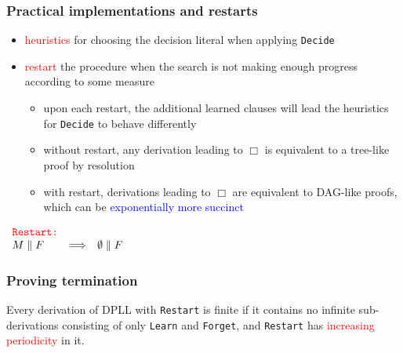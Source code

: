 \documentclass[smaller]{beamer}
\newcommand{\state}[2]{{#1\parallel #2}}
\newcommand{\blue}[1]{\textcolor{blue}{#1}}
\newcommand{\red}[1]{\textcolor{red}{#1}}
\begin{document}
\begin{frame}
\frametitle{Practical implementations and restarts}
\begin{itemize}
\item \red{heuristics} for choosing the decision literal when applying {\tt Decide}
\item \red{restart} the procedure when the search is not making enough progress according to some measure
\begin{itemize}
	\item upon each restart, the additional learned clauses will lead the heuristics for {\tt Decide}
	to behave differently
	\item without restart, any derivation leading to $\Box$ is equivalent to a tree-like proof by resolution
	\item with restart, derivations leading to $\Box$ are equivalent to DAG-like proofs, which can be \blue{exponentially
	more succinct}
\end{itemize}
\end{itemize}

\hspace{6mm}
$
\begin{array}{lcl}
\red{\mbox{\tt Restart:}} \\
\state{M}{F}&\Longrightarrow& \state{\emptyset}{F} 
\end{array}
$
\end{frame}

\begin{frame}
\frametitle{Proving termination}
\begin{theorem}
Every derivation of DPLL with {\tt Restart} is finite if it contains no infinite sub-derivations consisting of only {\tt Learn} and {\tt Forget}, and {\tt Restart} has \red{increasing periodicity} in it.
\end{theorem}
\end{frame}
\end{document}
